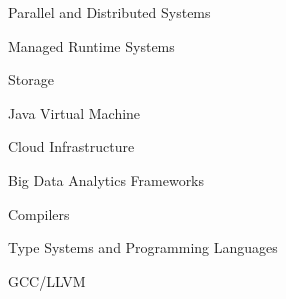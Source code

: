
\begin{minipage}[t]{.33\linewidth}
  \begin{cvitems}
    \item Parallel and Distributed Systems
    \item Managed Runtime Systems
    \item Storage
  \end{cvitems}
\end{minipage}%
%
\hspace{20pt}
%
\begin{minipage}[t]{.33\linewidth}
  \begin{cvitems}
    \item Java Virtual Machine
    \item Cloud Infrastructure
    \item Big Data Analytics Frameworks
  \end{cvitems}
\end{minipage}%
%
\hspace{20pt}
%
\begin{minipage}[t]{.33\linewidth}
  \begin{cvitems}
    \item Compilers
    \item Type Systems and
	 Programming Languages
    \item GCC/LLVM
  \end{cvitems}
\end{minipage}%
%

\vspace{15pt}

